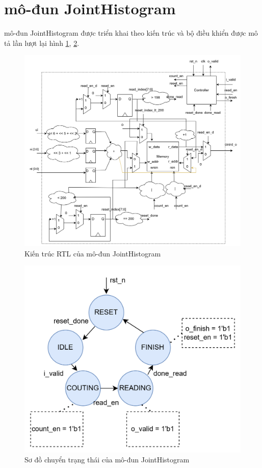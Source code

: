 \section{mô-đun JointHistogram}
mô-đun JointHistogram được triển khai theo kiến trúc và bộ điều khiển được mô tả lần lượt lại hình \ref{fig:jointHistogramRTL}, \ref{fig:jointHistogramTrans}.
\begin{figure}[!ht]
	\centering
	\includegraphics[width=1\linewidth]{figures/jointHistogramRTL.png}
	\caption{Kiến trúc RTL của mô-đun JointHistogram}
	\label{fig:jointHistogramRTL}
\end{figure}
\begin{figure}[!ht]
	\centering
	\includegraphics[width=0.5\linewidth]{figures/jointHistogramTrans.png}
	\caption{Sơ đồ chuyển trạng thái của mô-đun JointHistogram}
	\label{fig:jointHistogramTrans}
\end{figure}
